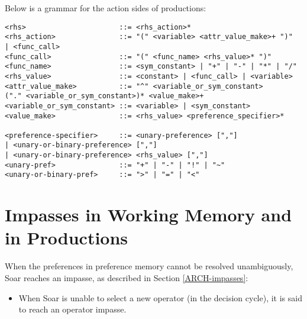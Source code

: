 

Below is a grammar for the action sides of productions:
\begin{verbatim}
<rhs>                      ::= <rhs_action>*
<rhs_action>               ::= "(" <variable> <attr_value_make>+ ")" 
| <func_call>
<func_call>                ::= "(" <func_name> <rhs_value>* ")"
<func_name>                ::= <sym_constant> | "+" | "-" | "*" | "/"
<rhs_value>                ::= <constant> | <func_call> | <variable>
<attr_value_make>          ::= "^" <variable_or_sym_constant>
("." <variable_or_sym_constant>)* <value_make>+
<variable_or_sym_constant> ::= <variable> | <sym_constant>
<value_make>               ::= <rhs_value> <preference_specifier>*

<preference-specifier>     ::= <unary-preference> [","]
| <unary-or-binary-preference> [","]
| <unary-or-binary-preference> <rhs_value> [","]
<unary-pref>               ::= "+" | "-" | "!" | "~"
<unary-or-binary-pref>     ::= ">" | "=" | "<"
\end{verbatim}



\section{Impasses in Working Memory and in Productions}
\label{SYNTAX-impasses}

When the preferences in preference memory cannot be resolved unambiguously, Soar reaches an impasse, as described in Section \ref{ARCH-impasses}:

\vspace{-12pt}
\begin{itemize}
\item When Soar is unable to select a new operator (in the decision cycle), it is said to reach an operator impasse.
\end{itemize}
\vspace{-8pt}

